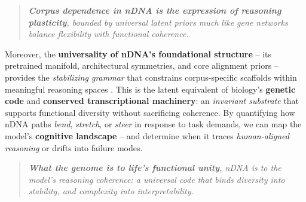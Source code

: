 \vspace{-1mm}
\begin{quote}
\emph{\textbf{Corpus dependence in nDNA is the expression of reasoning plasticity}, bounded by universal latent priors much like gene networks balance flexibility with functional coherence.}
\end{quote}
\vspace{-1mm}

Moreover, the \textbf{universality of nDNA’s foundational structure} -- its pretrained manifold, architectural symmetries, and core alignment priors -- provides the \emph{stabilizing grammar} that constrains corpus-specific scaffolds within meaningful reasoning spaces \citep{vaswani2017attention, bommasani2021opportunities}. 
This is the latent equivalent of biology’s \textbf{genetic code} and \textbf{conserved transcriptional machinery}: an \emph{invariant substrate} that supports functional diversity without sacrificing coherence. 
By quantifying how nDNA paths \emph{bend}, \emph{stretch}, or \emph{steer} in response to task demands, we can map the model’s \textbf{cognitive landscape} -- and determine when it traces \emph{human-aligned reasoning} or drifts into failure modes.

\vspace{-1mm}
\begin{quote}
\emph{\textbf{What the genome is to life's functional unity}, nDNA is to the model’s reasoning coherence: a universal code that binds diversity into stability, and complexity into interpretability.}
\end{quote}
\vspace{-1mm}






